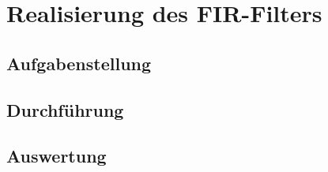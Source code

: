 \chapter{Realisierung des FIR-Filters}
\section{Aufgabenstellung}
\section{Durchf\"uhrung}
\section{Auswertung}
